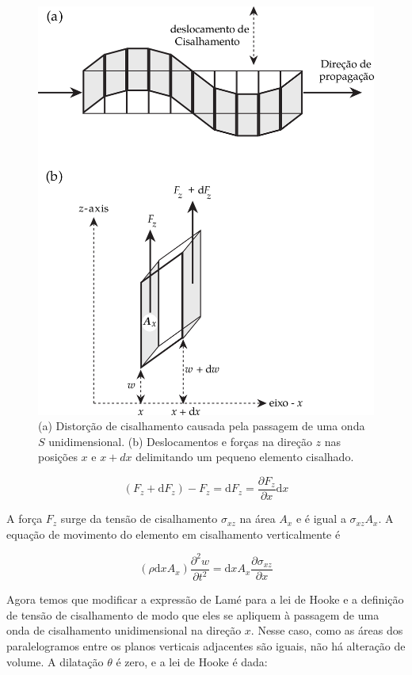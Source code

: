 \documentclass[]{book}
\theoremstyle{definition}
\theoremstyle{definition}
\theoremstyle{definition}
\theoremstyle{remark}
\begin{document}
\begin{figure}

{\centering \includegraphics[width=0.7\linewidth]{fig/Fig_03.12} 

}

\caption{(a) Distorção de cisalhamento causada pela passagem de uma onda $S$ unidimensional. (b) Deslocamentos e forças na direção $z$ nas posições $x$ e $x+dx$ delimitando um pequeno elemento cisalhado.}\label{fig:cisa}
\end{figure}

\begin{equation}
\left(F_{z}+\mathrm{d} F_{z}\right)-F_{z}=\mathrm{d} F_{z}=\frac{\partial F_{z}}{\partial x} \mathrm{d} x \label{eq:0323}
\end{equation}

A força \(F_z\) surge da tensão de cisalhamento \(\sigma_{xz}\) na área \(A_x\) e é igual a \(\sigma_{xz} A_x\). A equação de movimento do elemento em cisalhamento verticalmente é

\begin{equation}
\left(\rho \mathrm{d} x A_{x}\right) \frac{\partial^{2} w}{\partial t^{2}}=\mathrm{d} x A_{x} \frac{\partial \sigma_{x z}}{\partial x} \label{eq:0324}
\end{equation}

Agora temos que modificar a expressão de Lamé para a lei de Hooke e a definição de tensão de cisalhamento de modo que eles se apliquem à passagem de uma onda de cisalhamento unidimensional na direção \(x\). Nesse caso, como as áreas dos paralelogramos entre os planos verticais adjacentes são iguais, não há alteração de volume. A dilatação \(\theta\) é zero, e a lei de Hooke é dada:
\end{document}
